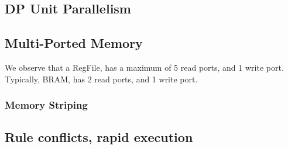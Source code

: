 \documentclass[a4paper,9pt]{report}
\begin{document}

\subsection{DP Unit Parallelism}


% 

\subsection{Multi-Ported Memory}

We observe that a RegFile, has a maximum of 5 read ports, and 1 write port.
Typically, BRAM, has 2 read ports, and 1 write port.


\subsubsection{Memory Striping}

\subsection{Rule conflicts, rapid execution}

\end{document}

